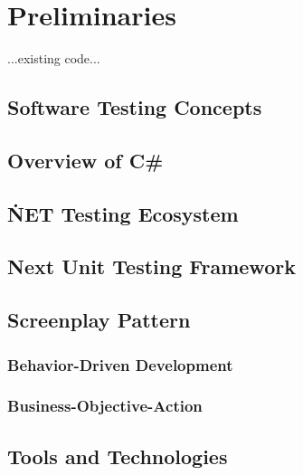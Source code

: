 \chapter{Preliminaries\label{chap:preliminaries}}

...existing code...

\section{Software Testing Concepts}


\section{Overview of C\#}


\section{\.NET Testing Ecosystem}


\section{Next Unit Testing Framework}


\section{Screenplay Pattern}


\subsection{Behavior-Driven Development}


\subsection{Business-Objective-Action}


\section{Tools and Technologies}